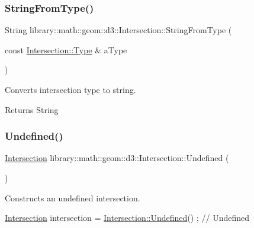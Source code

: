 \subsubsection{\texorpdfstring{String\+From\+Type()}{StringFromType()}}
{\footnotesize\ttfamily String library\+::math\+::geom\+::d3\+::\+Intersection\+::\+String\+From\+Type (\begin{DoxyParamCaption}\item[{const \hyperlink{classlibrary_1_1math_1_1geom_1_1d3_1_1_intersection_a3465d607fd42380f350598e055271b05}{Intersection\+::\+Type} \&}]{a\+Type }\end{DoxyParamCaption})\hspace{0.3cm}{\ttfamily [static]}}



Converts intersection type to string. 

\begin{DoxyReturn}{Returns}
String 
\end{DoxyReturn}
\mbox{\label{classlibrary_1_1math_1_1geom_1_1d3_1_1_intersection_a6ce0af0ff5c24a4b56c264d2d3d6e59b}} 
\subsubsection{\texorpdfstring{Undefined()}{Undefined()}}
{\footnotesize\ttfamily \hyperlink{classlibrary_1_1math_1_1geom_1_1d3_1_1_intersection}{Intersection} library\+::math\+::geom\+::d3\+::\+Intersection\+::\+Undefined (\begin{DoxyParamCaption}{ }\end{DoxyParamCaption})\hspace{0.3cm}{\ttfamily [static]}}



Constructs an undefined intersection. 


\begin{DoxyCode}
\hyperlink{classlibrary_1_1math_1_1geom_1_1d3_1_1_intersection_ab800dbab95076a1d7ae47bd9d0887da3}{Intersection} intersection = \hyperlink{classlibrary_1_1math_1_1geom_1_1d3_1_1_intersection_a6ce0af0ff5c24a4b56c264d2d3d6e59b}{Intersection::Undefined}() ; \textcolor{comment}{// Undefined}
\end{DoxyCode}


